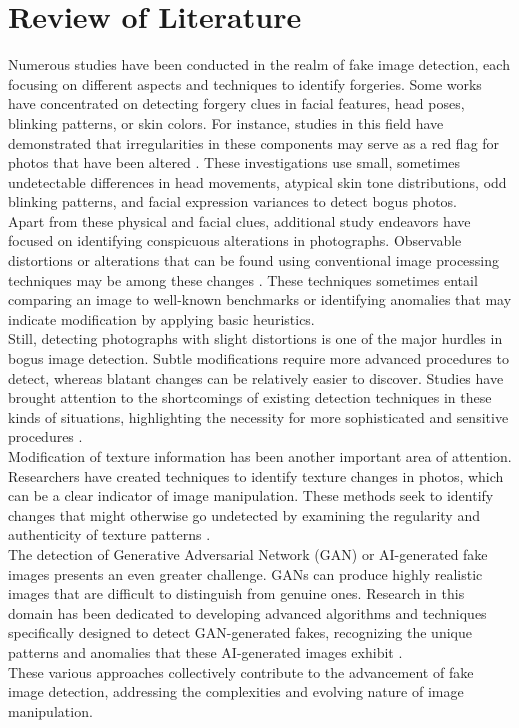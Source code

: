\documentclass[a4paper,14pt]{report}
\begin{document}
\chapter{Review of Literature}
Numerous studies have been conducted in the realm of fake image detection, each focusing on different aspects and techniques to identify forgeries. Some works have concentrated on detecting forgery clues in facial features, head poses, blinking patterns, or skin colors. For instance, studies in this field have demonstrated that irregularities in these components may serve as a red flag for photos that have been altered \cite{4} \cite{5} \cite{6}. These investigations use small, sometimes undetectable differences in head movements, atypical skin tone distributions, odd blinking patterns, and facial expression variances \cite{7} \cite{8} to detect bogus photos.\\
Apart from these physical and facial clues, additional study endeavors have focused on identifying conspicuous alterations in photographs. Observable distortions or alterations that can be found using conventional image processing techniques may be among these changes \cite{6} \cite{9}. These techniques sometimes entail comparing an image to well-known benchmarks or identifying anomalies that may indicate modification by applying basic heuristics.\\
Still, detecting photographs with slight distortions is one of the major hurdles in bogus image detection. Subtle modifications require more advanced procedures to detect, whereas blatant changes can be relatively easier to discover. Studies have brought attention to the shortcomings of existing detection techniques in these kinds of situations, highlighting the necessity for more sophisticated and sensitive procedures \cite{10} \cite{11} \cite{15} \cite{16}.\\
Modification of texture information has been another important area of attention. Researchers have created techniques to identify texture changes in photos, which can be a clear indicator of image manipulation. These methods seek to identify changes that might otherwise go undetected by examining the regularity and authenticity of texture patterns \cite{13} \cite{16}.\\
The detection of Generative Adversarial Network (GAN) or AI-generated fake images presents an even greater challenge. GANs can produce highly realistic images that are difficult to distinguish from genuine ones. Research in this domain has been dedicated to developing advanced algorithms and techniques specifically designed to detect GAN-generated fakes, recognizing the unique patterns and anomalies that these AI-generated images exhibit \cite{10} \cite{12} \cite{14} \cite{18}.\\
These various approaches collectively contribute to the advancement of fake image detection, addressing the complexities and evolving nature of image manipulation.
\end{document}

